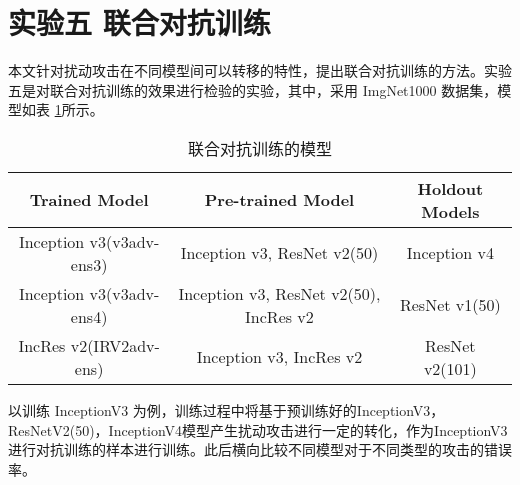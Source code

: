 \section{实验五 \; 联合对抗训练}
本文针对扰动攻击在不同模型间可以转移的特性，提出联合对抗训练的方法。实验五是对联合对抗训练的效果进行检验的实验，其中，采用 ImgNet1000 数据集，模型如表 \ref{tab:table3}所示。


\begin{table}[htbp]
\centering
\begin{tabular}{ccc}
\textbf{Trained Model}   & \textbf{Pre-trained Model}             & \textbf{Holdout Models} \\ \hline
Inception v3(v3adv-ens3) & Inception v3, ResNet v2(50)            & Inception v4            \\
Inception v3(v3adv-ens4) & Inception v3, ResNet v2(50), IncRes v2 & ResNet v1(50)           \\
IncRes v2(IRV2adv-ens)   & Inception v3, IncRes v2                & ResNet v2(101)          \\ \hline
\end{tabular}
\caption{联合对抗训练的模型}
\label{tab:table3}
\end{table}


以训练 InceptionV3 为例，训练过程中将基于预训练好的InceptionV3，ResNetV2(50)，InceptionV4模型产生扰动攻击进行一定的转化，作为InceptionV3进行对抗训练的样本进行训练。此后横向比较不同模型对于不同类型的攻击的错误率。


